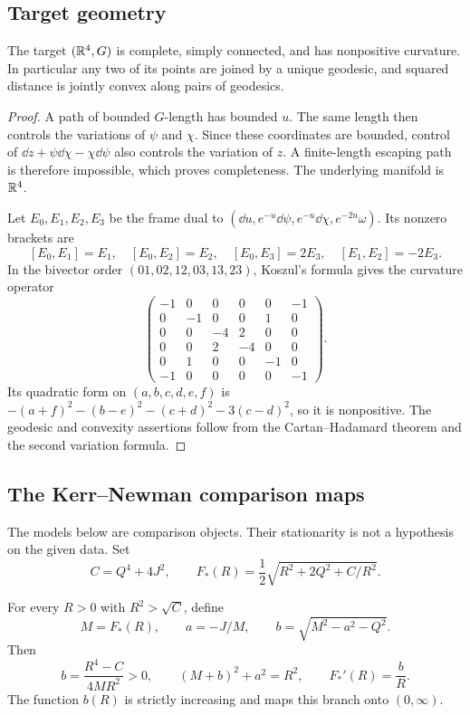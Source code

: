 \subsection{Target geometry}

\begin{lemma}\label{a:target-geometry}
The target $(\mathbb R^4,G)$ is complete, simply connected, and has
nonpositive curvature.  In particular any two of its points are
joined by a unique geodesic, and squared distance is jointly
convex along pairs of geodesics.
\end{lemma}

\begin{proof}
A path of bounded $G$-length has bounded $u$.  The same length
then controls the variations of $\psi$ and $\chi$.  Since these
coordinates are bounded, control of
$\dd z+\psi\dd\chi-\chi\dd\psi$ also controls the variation
of $z$.  A finite-length escaping path is therefore impossible,
which proves completeness.  The underlying manifold is $\mathbb R^4$.

Let $E_0,E_1,E_2,E_3$ be the frame dual to
$(\dd u,e^{-u}\dd\psi,e^{-u}\dd\chi,e^{-2u}\omega)$.
Its nonzero brackets are
\[
 [E_0,E_1]=E_1,\quad [E_0,E_2]=E_2,\quad
 [E_0,E_3]=2E_3,\quad [E_1,E_2]=-2E_3.
\]
In the bivector order $(01,02,12,03,13,23)$, Koszul's formula
gives the curvature operator
\[
 \begin{pmatrix}
 -1&0&0&0&0&-1\\
 0&-1&0&0&1&0\\
 0&0&-4&2&0&0\\
 0&0&2&-4&0&0\\
 0&1&0&0&-1&0\\
 -1&0&0&0&0&-1
 \end{pmatrix}.
\]
Its quadratic form on $(a,b,c,d,e,f)$ is
$-(a+f)^2-(b-e)^2-(c+d)^2-3(c-d)^2$, so it is
nonpositive.  The geodesic and convexity assertions follow from
the Cartan--Hadamard theorem and the second variation formula.
\end{proof}

\subsection{The Kerr--Newman comparison maps}

The models below are comparison objects.  Their stationarity is
not a hypothesis on the given data.  Set
\[
 C=Q^4+4J^2,\qquad
 F_*(R)=\frac12\sqrt{R^2+2Q^2+C/R^2}.
\]

\begin{lemma}\label{a:model-parameters}
For every $R>0$ with $R^2>\sqrt C$, define
\[
 M=F_*(R),\qquad a=-J/M,\qquad
 b=\sqrt{M^2-a^2-Q^2}.
\]
Then
\begin{equation}\label{a:parameter-identities}
 b=\frac{R^4-C}{4MR^2}>0,\qquad
 (M+b)^2+a^2=R^2,\qquad F_*'(R)=\frac bR.
\end{equation}
The function $b(R)$ is strictly increasing and maps this branch
onto $(0,\infty)$.
\end{lemma}


